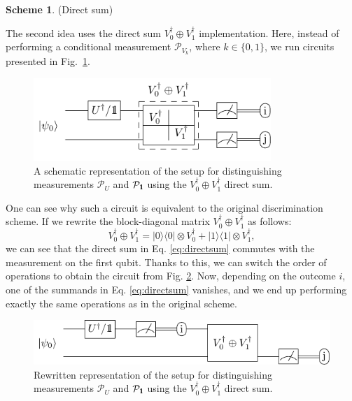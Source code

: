 \documentclass[preprint,12pt, a4paper, dvipsnames]{elsarticle}
\newcommand{\ket}[1]{\ensuremath{|#1\rangle}}
\newcommand{\bra}[1]{\ensuremath{\langle#1|}}
\newcommand{\ketbra}[2]{\ensuremath{\ket{#1}\bra{#2}}}
\newcommand{\proj}[1]{\ensuremath{\ketbra{#1}{#1}}}
\newcommand{\1}{{\rm 1\hspace{-0.9mm}l}}
\newcommand{\Id}{{\rm 1\hspace{-0.9mm}l}}
\newcommand{\PP}{\mathcal{P}}
\theoremstyle{definition}
\newtheorem{scheme}{Scheme}
\begin{document}
\begin{scheme}(Direct sum)

The second idea uses the direct sum $V_0^\dagger \oplus V_1^\dagger$ implementation.     Here, instead of performing a conditional
measurement $\PP_{V_k}$, where $k\in \{0,1\}$,  we run circuits presented in
Fig.~\ref{fig:controlled}.

	\begin{figure}[h!]
		\centering
		\includegraphics[width=0.8\textwidth]{pics/controlled_unitary}

		\caption{ A schematic representation of the setup for distinguishing
			measurements $\PP_{U}$ and $\PP_{\Id}$ using the $V_0^\dagger \oplus V_1^\dagger$ direct sum.
		}\label{fig:controlled}
	\end{figure}

	One can see why such a circuit is equivalent to the original discrimination scheme.
	If we rewrite the block-diagonal matrix $V_0^\dagger \oplus V_1^\dagger$ as follows:
	\begin{equation}
		\label{eq:directsum}
		V_0^\dagger \oplus V_1^\dagger = \proj{0}\otimes V_0^\dagger + \proj{1} \otimes V_1^\dagger,
	\end{equation}
	we can see that the direct sum in Eq. \eqref{eq:directsum} commutes with the measurement on the
	first qubit. Thanks to this, we can switch the order of operations to obtain the circuit from
	Fig. \ref{fig:directsum}. Now, depending on the outcome $i$, one of the summands in
	Eq. \eqref{eq:directsum} vanishes, and we end up performing exactly the same operations as in the
	original scheme.

	\begin{figure}[h!]
		\centering
		\includegraphics[width=\textwidth]{pics/direct_sum}
		\caption{Rewritten representation of the setup for distinguishing
		measurements $\PP_{U}$ and $\PP_{\Id}$ using the $V_0^\dagger \oplus V_1^\dagger$ direct
		sum.
		}\label{fig:directsum}
	\end{figure}


\end{scheme}
\end{document}
